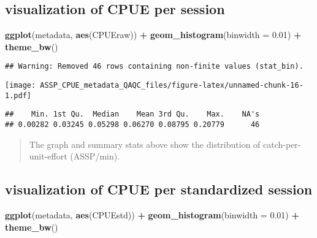 \documentclass[
]{article}
\newenvironment{Shaded}{\begin{snugshade}}{\end{snugshade}}
\newcommand{\CommentTok}[1]{\textcolor[rgb]{0.56,0.35,0.01}{\textit{#1}}}
\newcommand{\DataTypeTok}[1]{\textcolor[rgb]{0.13,0.29,0.53}{#1}}
\newcommand{\FloatTok}[1]{\textcolor[rgb]{0.00,0.00,0.81}{#1}}
\newcommand{\KeywordTok}[1]{\textcolor[rgb]{0.13,0.29,0.53}{\textbf{#1}}}
\newcommand{\NormalTok}[1]{#1}
\newcommand{\OperatorTok}[1]{\textcolor[rgb]{0.81,0.36,0.00}{\textbf{#1}}}
\newcommand{\StringTok}[1]{\textcolor[rgb]{0.31,0.60,0.02}{#1}}
\begin{document}
\hypertarget{visualization-of-cpue-per-session}{%
\subsection{visualization of CPUE per
session}\label{visualization-of-cpue-per-session}}

\begin{Shaded}
\begin{Highlighting}[]
\KeywordTok{ggplot}\NormalTok{(metadata, }\KeywordTok{aes}\NormalTok{(CPUEraw)) }\OperatorTok{+}
\StringTok{  }\KeywordTok{geom_histogram}\NormalTok{(}\DataTypeTok{binwidth =} \FloatTok{0.01}\NormalTok{) }\OperatorTok{+}
\StringTok{  }\KeywordTok{theme_bw}\NormalTok{()}
\end{Highlighting}
\end{Shaded}

\begin{verbatim}
## Warning: Removed 46 rows containing non-finite values (stat_bin).
\end{verbatim}

\texttt{[image: ASSP\_CPUE\_metadata\_QAQC\_files/figure-latex/unnamed-chunk-16-1.pdf]}

\begin{Shaded}
\end{Shaded}

\begin{verbatim}
##    Min. 1st Qu.  Median    Mean 3rd Qu.    Max.    NA's 
## 0.00282 0.03245 0.05298 0.06270 0.08795 0.20779      46
\end{verbatim}

\begin{quote}
The graph and summary stats above show the distribution of
catch-per-unit-effort (ASSP/min).
\end{quote}

\hypertarget{visualization-of-cpue-per-standardized-session}{%
\subsection{visualization of CPUE per standardized
session}\label{visualization-of-cpue-per-standardized-session}}

\begin{Shaded}
\begin{Highlighting}[]
\KeywordTok{ggplot}\NormalTok{(metadata, }\KeywordTok{aes}\NormalTok{(CPUEstd)) }\OperatorTok{+}
\StringTok{  }\KeywordTok{geom_histogram}\NormalTok{(}\DataTypeTok{binwidth =} \FloatTok{0.01}\NormalTok{) }\OperatorTok{+}
\StringTok{  }\KeywordTok{theme_bw}\NormalTok{()}
\end{Highlighting}
\end{Shaded}
\end{document}
